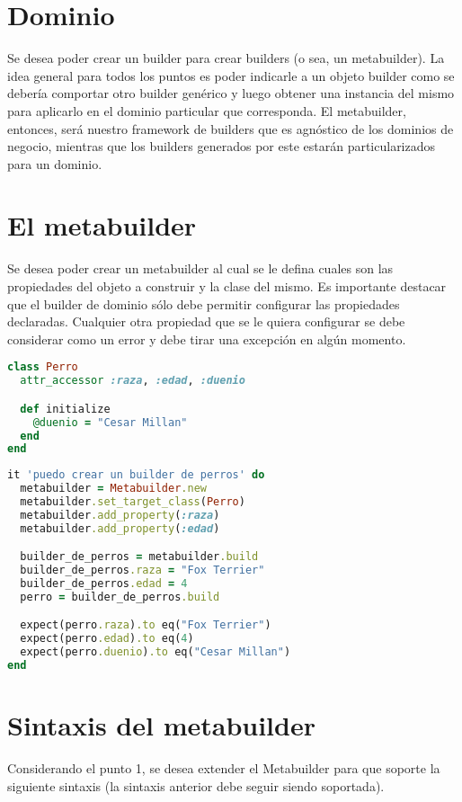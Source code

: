\documentclass[spanish,a4paper]{article}
\begin{document}
\maketitle

\section*{Dominio}
Se desea poder crear un builder para crear builders (o sea, un metabuilder). La idea general para todos los puntos es poder indicarle a un objeto builder como se debería comportar otro builder genérico y luego obtener una instancia del mismo para aplicarlo en el dominio particular que corresponda.
El metabuilder, entonces, será nuestro framework de builders que es agnóstico de los dominios de negocio, mientras que los builders generados por este estarán particularizados para un dominio.
\section{El metabuilder}

Se desea poder crear un metabuilder al cual se le defina cuales son las propiedades del objeto a construir y la clase del mismo.
Es importante destacar que el builder de dominio sólo debe permitir configurar las propiedades declaradas. Cualquier otra propiedad que se le quiera configurar se debe considerar como un error y debe tirar una excepción en algún momento.

  \begin{lstlisting}[language=Ruby]
class Perro
  attr_accessor :raza, :edad, :duenio

  def initialize
    @duenio = "Cesar Millan"
  end
end
  \end{lstlisting}
  
  \begin{lstlisting}[language=Ruby]
it 'puedo crear un builder de perros' do
  metabuilder = Metabuilder.new
  metabuilder.set_target_class(Perro)
  metabuilder.add_property(:raza)
  metabuilder.add_property(:edad)

  builder_de_perros = metabuilder.build
  builder_de_perros.raza = "Fox Terrier"
  builder_de_perros.edad = 4
  perro = builder_de_perros.build

  expect(perro.raza).to eq("Fox Terrier")
  expect(perro.edad).to eq(4)
  expect(perro.duenio).to eq("Cesar Millan")
end
  \end{lstlisting}

\section{Sintaxis del metabuilder}
Considerando el punto 1, se desea extender el Metabuilder para que soporte la siguiente sintaxis (la sintaxis anterior debe seguir siendo soportada).
\end{document}
